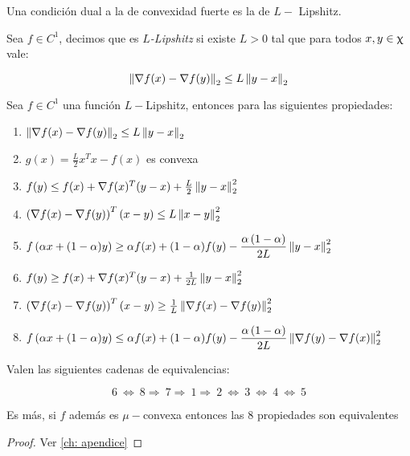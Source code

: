 Una condici\'on dual a la de convexidad fuerte es la de $L-$ Lipshitz.

\begin{definition}
	\label{def: L Lipshitz}
	Sea $f \in C^1$, decimos que es $L$\textit{-Lipshitz} si existe $L > 0$ tal que para todos $x,y \in \upchi$ vale:
	
	\begin{equation}
	\left\lVert\nabla f(x) - \nabla f (y)\right\rVert_2 \leq  L\left\lVert y-x\right\rVert_2
	\end{equation}
\end{definition}

\begin{proposition}
	\label{prop: Implicancias L lipshitz}
	Sea $f \in C^1$ una funci\'on $L-$Lipshitz, entonces para las siguientes propiedades:
	
	\begin{enumerate}
		\item $\left\lVert\nabla f(x) - \nabla f (y)\right\rVert_2 \leq  L\left\lVert y-x\right\rVert_2$
		\item $g(x) = \frac{L}{2} x^Tx - f(x)$ es convexa
		\item $f(y) \leq f(x) + \nabla f(x)^T (y-x) + \frac{L}{2}\left\lVert y-x\right\rVert_2^2$
		\item $\left(\nabla f(x) - \nabla f(y)\right)^T (x-y) \leq L\left\lVert x-y\right\rVert^2_2$
		\item $f\left(\alpha x + (1-\alpha)y\right) \geq \alpha f(x) + (1-\alpha) f(y) - \dfrac{\alpha \left(1 - \alpha \right)}{2L}\left\lVert y-x\right\rVert_2^2$
		\item $f(y) \geq f(x) + \nabla f(x)^T (y-x) +\frac{1}{2L} \left\lVert y-x\right\rVert^2_2$
		\item $\left(\nabla f(x) - \nabla f(y)\right)^T (x-y) \geq \frac{1}{L}\left\lVert\nabla f(x)- \nabla f(y)\right\rVert^2_2$
		\item $f\left(\alpha x + (1-\alpha)y\right) \leq \alpha f(x) + (1-\alpha) f(y) - \dfrac{\alpha \left(1 - \alpha \right)}{2L}\left\lVert\nabla f(y)- \nabla f (x)\right\rVert_2^2$
	\end{enumerate}
	
	Valen las siguientes cadenas de equivalencias:
	
	\begin{equation*}
		6 \ \Longleftrightarrow \ 8 \Longrightarrow \ 7 \Longrightarrow \ 1 \Longrightarrow \ 2 \ \Longleftrightarrow \ 3 \ \Longleftrightarrow \ 4 \ \Longleftrightarrow \ 5
	\end{equation*}
	
	Es m\'as, si $f$ adem\'as es $\mu-$convexa entonces las 8 propiedades son equivalentes
	
\end{proposition}

\begin{proof}
	Ver \ref{ch: apendice}
\end{proof}